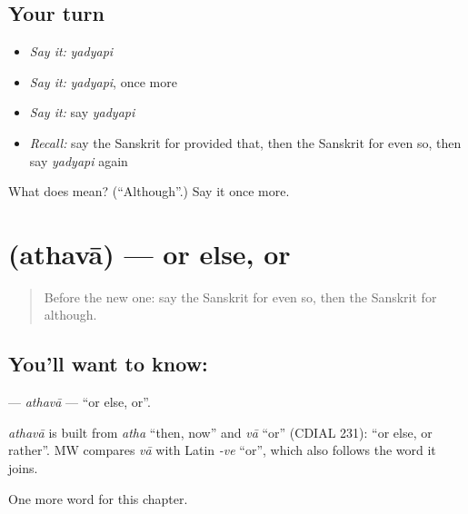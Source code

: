 \subsection*{Your turn}
\begin{itemize}
\raggedright
  \item \emph{Say it:} \emph{yadyapi}
  \item \emph{Say it:} \emph{yadyapi}, once more
  \item \emph{Say it:} say \emph{yadyapi}
  \item \emph{Recall:} say the Sanskrit for provided that, then the Sanskrit for even so, then say \emph{yadyapi} again
\end{itemize}

\begin{tcolorbox}[breakable,colback=teal!4,colframe=teal!35!black,title={Before you move on}]
What does  mean? (\textquotedblleft{}Although\textquotedblright{}.) Say it once more.
\end{tcolorbox}
\section[\texorpdfstring{\sk{अथवा} (athavā)}{अथवा (athavā)}]{ (athavā) — or else, or}

\label{lesson:SA-C154-athava}



\begin{quote}
Before the new one: say the Sanskrit for even so, then the Sanskrit for although.
\end{quote}

\subsection*{You'll want to know: }
\textbf{} — \emph{athavā} — \textquotedblleft{}or else, or\textquotedblright{}.

\begin{cousinweb}
\emph{athavā} is built from \emph{atha} \textquotedblleft{}then, now\textquotedblright{} and \emph{vā} \textquotedblleft{}or\textquotedblright{} (CDIAL 231): \textquotedblleft{}or else, or rather\textquotedblright{}. MW compares \emph{vā} with Latin \emph{-ve} \textquotedblleft{}or\textquotedblright{}, which also follows the word it joins.
\end{cousinweb}

\begin{grammarlens}[title={What you've built}]
One more word for this chapter.
\end{grammarlens}


